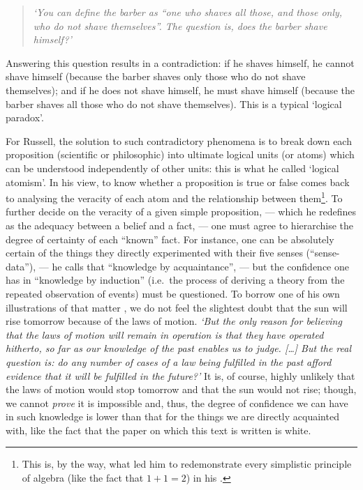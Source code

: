 \begin{quote}
	\textit{‘You can define the barber as “one who shaves all those, and those only, who do not shave themselves”. The question is, does the barber shave himself?’}
\end{quote}

Answering this question results in a contradiction: if he shaves himself, he cannot shave himself (because the barber shaves only those who do not shave themselves); and if he does not shave himself, he must shave himself (because the barber shaves all those who do not shave themselves). This is a typical ‘logical paradox’.

For Russell, the solution to such contradictory phenomena is to break down each proposition (scientific or philosophic) into ultimate logical units (or atoms) which can be understood independently of other units: this is what he called ‘logical atomism’.
In his view, to know whether a proposition is true or false comes back to analysing the veracity of each atom and the relationship between them\footnote{This is, by the way, what led him to redemonstrate every simplistic principle of algebra (like the fact that $1+1=2$) in his \textit{} \citeyearpar{whitehead1912principia}.}.
To further decide on the veracity of a given simple proposition, — which he redefines as the adequacy between a belief and a fact, — 
one must agree to hierarchise the degree of certainty of each “known” fact.
For instance, one can be absolutely certain of the things they directly experimented with their five senses (“sense-data”), — he calls that “knowledge by acquaintance”, — but the confidence one has in “knowledge by induction” (i.e.\ the process of deriving a theory from the repeated observation of events) must be questioned.
To borrow one of his own illustrations of that matter \citep{russell1912problems}, we do not feel the slightest doubt that the sun will rise tomorrow because of the laws of motion.
\textit{‘But the \textit{only} reason for believing that the laws of motion will remain in operation is that they have operated hitherto, so far as our knowledge of the past enables us to judge. […] But the real question is: do any number of cases of a law being fulfilled in the past afford evidence that it will be fulfilled in the future?’}
It is, of course, highly unlikely that the laws of motion would stop tomorrow and that the sun would not rise; though, we cannot \textit{prove} it is impossible and, thus, the degree of confidence we can have in such knowledge is lower than that for the things we are directly acquainted with, like the fact that the paper on which this text is written is white.

